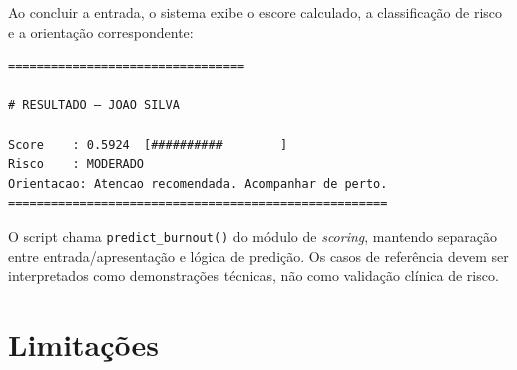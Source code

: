 \documentclass[conference]{IEEEtran}
\begin{document}
Ao concluir a entrada, o sistema exibe o escore calculado, a classificação
de risco e a orientação correspondente:

\begin{lstlisting}[caption={Exemplo de saída do \texttt{prever.py}
para um caso de risco moderado.}]
=================================

# RESULTADO — JOAO SILVA

Score    : 0.5924  [##########        ]
Risco    : MODERADO
Orientacao: Atencao recomendada. Acompanhar de perto.
=====================================================

\end{lstlisting}

O script chama \texttt{predict_burnout()} do módulo de \textit{scoring},
mantendo separação entre entrada/apresentação e lógica de predição. Os
casos de referência devem ser interpretados como demonstrações técnicas,
não como validação clínica de risco.

\section{Limitações}
\label{sec:limit}
\end{document}
